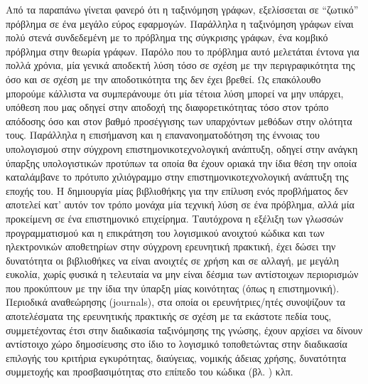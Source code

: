 Από τα παραπάνω γίνεται φανερό ότι η ταξινόμηση γράφων, εξελίσσεται σε ``ζωτικό'' πρόβλημα σε ένα μεγάλο εύρος εφαρμογών.
Παράλληλα η ταξινόμηση γράφων είναι πολύ στενά συνδεδεμένη με το πρόβλημα της σύγκρισης γράφων, ένα κομβικό πρόβλημα στην θεωρία γράφων.
Παρόλο που το πρόβλημα αυτό μελετάται έντονα για πολλά χρόνια, μία γενικά αποδεκτή λύση τόσο σε σχέση με την περιγραφικότητα της όσο και σε σχέση με την αποδοτικότητα της δεν έχει βρεθεί.
Ως επακόλουθο μπορούμε κάλλιστα να συμπεράνουμε ότι μία τέτοια λύση μπορεί να μην υπάρχει, υπόθεση που μας οδηγεί στην αποδοχή της διαφορετικότητας τόσο στον τρόπο απόδοσης όσο και στον βαθμό προσέγγισης των υπαρχόντων μεθόδων στην ολότητα τους.
Παράλληλα η επισήμανση και η επανανοηματοδότηση της έννοιας του υπολογισμού στην σύγχρονη επιστημονικοτεχνολογική ανάπτυξη, οδηγεί στην ανάγκη ύπαρξης υπολογιστικών προτύπων τα οποία θα έχουν οριακά την ίδια θέση την οποία καταλάμβανε το πρότυπο χιλιόγραμμο στην επιστημονικοτεχνολογική ανάπτυξη της εποχής του.
Η δημιουργία μίας βιβλιοθήκης για την επίλυση ενός προβλήματος δεν αποτελεί κατ' αυτόν τον τρόπο μονάχα μία τεχνική λύση σε ένα πρόβλημα, αλλά μία προκείμενη σε ένα επιστημονικό επιχείρημα.
Ταυτόχρονα η εξέλιξη των γλωσσών προγραμματισμού και η επικράτηση του λογισμικού ανοιχτού κώδικα και των ηλεκτρονικών αποθετηρίων στην σύγχρονη ερευνητική πρακτική, έχει δώσει την δυνατότητα οι βιβλιοθήκες να είναι ανοιχτές σε χρήση και σε αλλαγή, με μεγάλη ευκολία, χωρίς φυσικά η τελευταία να μην είναι δέσμια των αντίστοιχων περιορισμών που προκύπτουν με την ίδια την ύπαρξη μίας κοινότητας (όπως η επιστημονική).
Περιοδικά αναθεώρησης (journals), στα οποία οι ερευνήτριες/ητές συνοψίζουν τα αποτελέσματα της ερευνητικής πρακτικής σε σχέση με τα εκάστοτε πεδία τους, συμμετέχοντας έτσι στην διαδικασία ταξινόμησης της γνώσης, έχουν αρχίσει να δίνουν αντίστοιχο χώρο δημοσίευσης στο ίδιο το λογισμικό τοποθετώντας στην διαδικασία επιλογής του κριτήρια εγκυρότητας, διαύγειας, νομικής άδειας χρήσης, δυνατότητα συμμετοχής και προσβασιμότητας στο επίπεδο του κώδικα (βλ. \href{http://www.jmlr.org/mloss/mloss-info.html}{}) κλπ.

